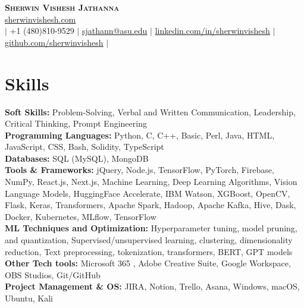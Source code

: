 \documentclass[letterpaper,11pt]{article}
\begin{document}

\begin{center}
    \textbf{\Huge \scshape Sherwin Vishesh Jathanna} \\ \vspace{1pt}
     \href{https://sherwinvishesh.com}{\underline{sherwinvishesh.com}} 
   \\ \small $|$ +1 (480)810-9529 $|$ \href{mailto:sjathann@asu.edu}{\underline{sjathann@asu.edu}} $|$ 
    \href{https://linkedin.com/in/sherwinvishesh}{\underline{linkedin.com/in/sherwinvishesh}} $|$
    \href{https://github.com/sherwinvishesh}{\underline{github.com/sherwinvishesh}} $|$
     \\ 
\end{center}




\section{Skills}
 \begin{itemize}[leftmargin=0.15in, label={}]
    \small{\item{
    \textbf{Soft Skills:}{ Problem-Solving, Verbal and Written Communication, Leadership, Critical Thinking, Prompt Engineering} \\
     \textbf{Programming Languages:}{ Python, C, C++, Basic, Perl, Java, HTML, JavaScript, CSS,  Bash, Solidity, TypeScript} \\
     \textbf{Databases:}{ SQL (MySQL), MongoDB} \\
     \textbf{Tools \& Frameworks:}{ jQuery, Node.js, TensorFlow, PyTorch, Firebase, NumPy, React.js, Next.js,  Machine Learning, Deep Learning Algorithms, Vision Language Models, HuggingFace Accelerate, IBM Watson, XGBoost, OpenCV, Flask, Keras, Transformers, Apache Spark, Hadoop, Apache Kafka, Hive, Dask, Docker, Kubernetes, MLflow, TensorFlow} \\
     \textbf{ML Techniques and Optimization:}{ Hyperparameter tuning, model pruning, and quantization, Supervised/unsupervised learning, clustering, dimensionality reduction, Text preprocessing, tokenization, transformers, BERT, GPT models} \\
     \textbf{Other Tech tools:}{ Microsoft 365 , Adobe Creative Suite, Google Workspace, OBS Studios, Git/GitHub } \\
     \textbf{Project Management \& OS: }{ JIRA, Notion, Trello, Asana, Windows, macOS, Ubuntu, Kali }
    }}
 \end{itemize}
\end{document}
